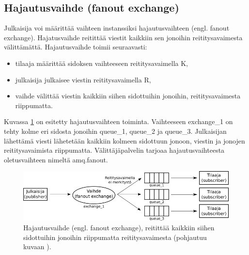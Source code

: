 \subsection{Hajautusvaihde (fanout exchange)}
Julkaisija voi määrittää vaihteen instanssiksi hajautusvaihteen (engl. fanout exchange). Hajatusvaihde reitittää viestit kaikkiin sen jonoihin reititysavaimesta välittämättä. Hajautusvaihde toimii seuraavasti:
\begin{itemize}
	\item tilaaja määrittää sidoksen vaihteeseen reititysavaimella K,
	\item julkaisija julkaisee viestin reititysavaimella R,
	\item vaihde välittää viestin kaikkiin siihen sidottuihin jonoihin, reititysavaimesta riippumatta.
\end{itemize}
Kuvassa \ref{fig:amqp-fanout-exchange} on esitetty hajautusvaihteen toiminta. Vaihteeseen exchange\_1 on tehty kolme eri sidosta jonoihin queue\_1, queue\_2 ja queue\_3. Julkaisijan lähettämä viesti lähetetään kaikkiin kolmeen sidottuun jonoon, viestin ja jonojen reititysavaimista riippumatta. Välittäjäpalvelin tarjoaa hajautusvaihteesta oletusvaihteen nimeltä amq.fanout. \cite[s.~27]{AMQP-specification}

\begin{figure}
	\includegraphics[width=1\textwidth]{pictures/amqp-fanout-exchange.png}
	\caption{Hajautusvaihde (engl. fanout exchange), reitittää kaikkiin siihen sidottuihin jonoihin riippumatta reititysavaimesta (pohjautuu kuvaan \cite{RabbitMQ-AMQP-0-9-1-Model-Explained}).}
	\label{fig:amqp-fanout-exchange}
\end{figure}


